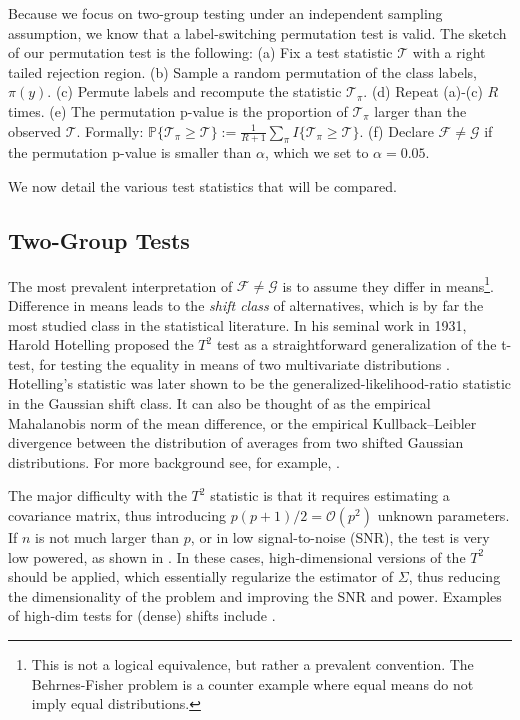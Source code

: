 \documentclass[]{bio}
\begin{document}
Because we focus on two-group testing under an independent sampling assumption, we know that a label-switching permutation test is valid. 
The sketch of our permutation test is the following: \newline
(a) Fix a test statistic $\mathcal{T}$ with a right tailed rejection region. \newline
(b) Sample a random permutation of the class labels, $\pi(y)$. \newline
(c) Permute labels and recompute the statistic $\mathcal{T}_\pi$. \newline
(d) Repeat (a)-(c) $R$ times. \newline
(e) The permutation p-value is the proportion of  $\mathcal{T}_\pi$ larger than the observed $\mathcal{T}$. Formally: 
$\mathbb{P}\{\mathcal{T}_\pi \geq \mathcal{T}\}:=\frac{1}{R+1} \sum_{\pi} I\{\mathcal{T}_\pi \geq \mathcal{T}\}$.\newline
(f) Declare $\mathcal{F}\neq \mathcal{G}$ if the permutation p-value is smaller than $\alpha$, which we set to $\alpha=0.05$.
\bigskip

We now detail the various test statistics that will be compared.


\subsection{Two-Group Tests}
The most prevalent interpretation of $\mathcal{F}\neq \mathcal{G}$ is to assume they differ in means\footnote{This is not a logical equivalence, but rather a prevalent convention. The Behrnes-Fisher problem is a counter example where equal means do not imply equal distributions.}. 
Difference in means leads to the \emph{shift class} of alternatives, which is by far the most studied class in the statistical literature. 
In his seminal work in 1931, Harold Hotelling proposed the $T^2$ test as a straightforward generalization of the t-test, for testing the equality in means of two multivariate distributions \cite{hotelling_generalization_1931}. 
Hotelling's statistic was later shown to be the generalized-likelihood-ratio statistic in the Gaussian shift class. 
It can also be thought of as the empirical Mahalanobis norm of the mean difference, or the empirical Kullback–Leibler divergence between the distribution of averages from two shifted Gaussian distributions. 
For more background see, for example, \cite{anderson_introduction_2003}.

The major difficulty with the $T^2$ statistic is that it requires estimating a covariance matrix, thus introducing $p(p+1)/2=\mathcal{O}(p^2)$ unknown parameters.
If $n$ is not much larger than $p$, or in low signal-to-noise (SNR), the test is very low powered, as shown in \cite{bai1996effect}. 
In these cases, high-dimensional versions of the $T^2$ should be applied, which essentially regularize the estimator of $\Sigma$, thus reducing the dimensionality of the problem and improving the SNR and power.
Examples of high-dim tests for (dense) shifts include 
\cite{dempster1958high,bai1996effect,schafer_shrinkage_2005,goeman2006testing,srivastava_test_2008,chen_two-sample_2010,lopes2011more,ahmad2014u,thulin2014high,feng2015note}.
\end{document}
